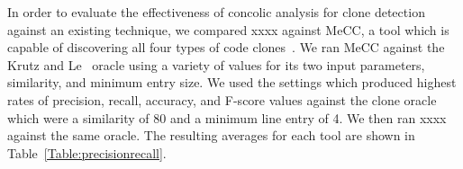 \documentclass{sig-alternate}
\newif\ifisnopii
\begin{document}













In order to evaluate the effectiveness of concolic analysis for clone detection against an existing technique, we compared \ifisnopii CCCD \else xxxx \fi against MeCC, a tool which is capable of discovering all four types of code clones~\cite{Kim:2011:MMC:1985793.1985835}. We ran MeCC against the Krutz and Le~\cite{Krutz:2014:CCO:2597073.2597127} oracle using a variety of values for its two input parameters, similarity, and minimum entry size. We used the settings which produced highest rates of precision, recall, accuracy, and F-score values against the clone oracle which were a similarity of 80 and a minimum line entry of 4. We then ran \ifisnopii CCCD \else xxxx \fi against the same oracle. The resulting averages for each tool are shown in Table~\ref{Table:precisionrecall}.




\end{document}
